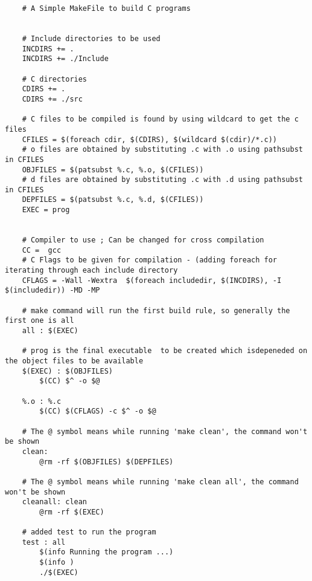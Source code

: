 \documentclass{article}
\begin{document}
\begin{verbatim}
    # A Simple MakeFile to build C programs


    # Include directories to be used
    INCDIRS += . 
    INCDIRS += ./Include
    
    # C directories 
    CDIRS += .
    CDIRS += ./src
    
    # C files to be compiled is found by using wildcard to get the c files
    CFILES = $(foreach cdir, $(CDIRS), $(wildcard $(cdir)/*.c))
    # o files are obtained by substituting .c with .o using pathsubst in CFILES
    OBJFILES = $(patsubst %.c, %.o, $(CFILES))
    # d files are obtained by substituting .c with .d using pathsubst in CFILES
    DEPFILES = $(patsubst %.c, %.d, $(CFILES))
    EXEC = prog
    
    
    # Compiler to use ; Can be changed for cross compilation
    CC =  gcc
    # C Flags to be given for compilation - (adding foreach for iterating through each include directory
    CFLAGS = -Wall -Wextra  $(foreach includedir, $(INCDIRS), -I $(includedir)) -MD -MP
    
    # make command will run the first build rule, so generally the first one is all
    all : $(EXEC)
    
    # prog is the final executable  to be created which isdepeneded on the object files to be available
    $(EXEC) : $(OBJFILES)
        $(CC) $^ -o $@
    
    %.o : %.c
        $(CC) $(CFLAGS) -c $^ -o $@
    
    # The @ symbol means while running 'make clean', the command won't be shown 
    clean:
        @rm -rf $(OBJFILES) $(DEPFILES)
    
    # The @ symbol means while running 'make clean all', the command won't be shown 
    cleanall: clean
        @rm -rf $(EXEC)
    
    # added test to run the program
    test : all
        $(info Running the program ...)
        $(info )
        ./$(EXEC)
    
\end{verbatim}
\end{document}
